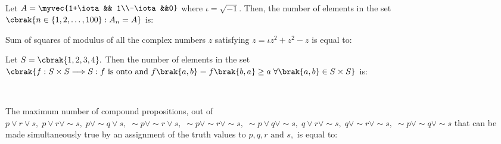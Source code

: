 \hfill{}
\\

\item  Let $A = \myvec{1+\iota && 1\\-\iota &&0} $ where $\iota=\sqrt{-1}.$ Then, the number of elements in the set $ \cbrak{n \in \{1, 2, \ldots, 100\} : A_n = A} $  is:\hfill{}\\

\item Sum of squares of modulus of all the complex numbers $z$ satisfying ${z} = \iota z^2 + z^2 - z$ is equal to:\hfill{}
\\

\item Let $S = \cbrak{1, 2, 3, 4}.$ Then the number of elements in the set $\cbrak{f : S \times S \Longrightarrow S : f \text{ is onto and }f\brak{a,b}=f\brak{b,a} \geq a \; \forall \brak{a,b} \in  S \times S}$ is:

\hfill{}
\\

\item  The maximum number of compound propositions, out of $p \lor r \lor s, \; p \lor r \lor \sim s, \; p \lor \sim q \lor s, \; \sim p \lor \sim r \lor s, \; \sim p \lor \sim r \lor \sim s, \; \sim p \lor q \lor \sim s, \; q \lor r \lor \sim s, \; q \lor \sim r \lor \sim s, \; \sim p \lor \sim q \lor \sim s$ that can be made simultaneously true by an assignment of the truth values to $p, q, r \text{ and } s,$ is equal to:\hfill{}


